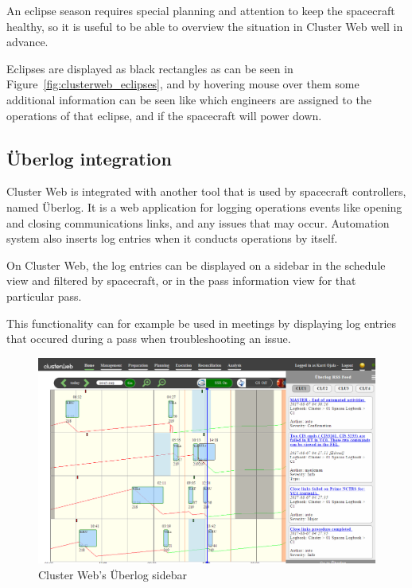  An eclipse season requires special planning and attention to keep the spacecraft healthy, so it is useful to be able to overview the situation in Cluster Web well in advance.
 
 Eclipses are displayed as black rectangles as can be seen in Figure~\ref{fig:clusterweb_eclipses}, and by hovering mouse over them some additional information can be seen like which engineers are assigned to the operations of that eclipse, and if the spacecraft will power down.
 
 \subsection{Überlog integration}
 Cluster Web is integrated with another tool that is used by spacecraft controllers, named Überlog. It is a web application for logging operations events like opening and closing communications links, and any issues that may occur. Automation system also inserts log entries when it conducts operations by itself.
 
 On Cluster Web, the log entries can be displayed on a sidebar in the schedule view and filtered by spacecraft, or in the pass information view for that particular pass.
 
 This functionality can for example be used in meetings by displaying log entries that occured during a pass when troubleshooting an issue.
 
\begin{figure}[ht]
  \begin{center}
    \includegraphics*[width=1\textwidth]{clusterweb_uberlog}
  \end{center}
  \caption{Cluster Web's Überlog sidebar}
  \label{fig:clusterweb_uberlog}
\end{figure}